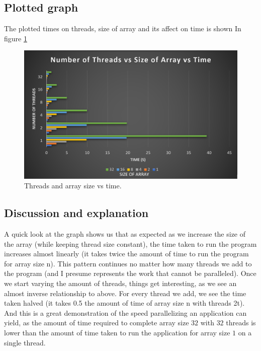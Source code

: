 \subsection{Plotted graph}

The plotted times on threads, size of array and its affect on time is shown In
figure \ref{fig:threasizetime}

\begin{figure}[!h]
    \centering
    \includegraphics[width=\linewidth]{Figures/graph.png}
    \caption{Threads and array size vs time.}
    \label{fig:threasizetime}
\end{figure}

\subsection{Discussion and explanation} 
A quick look at the graph shows us that as expected as we increase the size 
of the array (while keeping thread size constant), the time taken to run the 
program increases almost linearly (it takes twice the amount of time to run the 
program for array size n). This pattern continues no matter how many threads 
we add to the program (and I presume represents the work that cannot be 
paralleled). Once we start varying the amount of threads, things get 
interesting, as we see an almost inverse relationship to above. For every thread
we add, we see the time taken halved (it takes 0.5 the amount of time of array 
size n with threads 2t). And this is a great demonstration of the speed 
parallelizing an application can yield, as the amount of time required to 
complete array size $32$ with $32$ threads is lower than the amount of time taken
to run the application for array size $1$ on a single thread.
